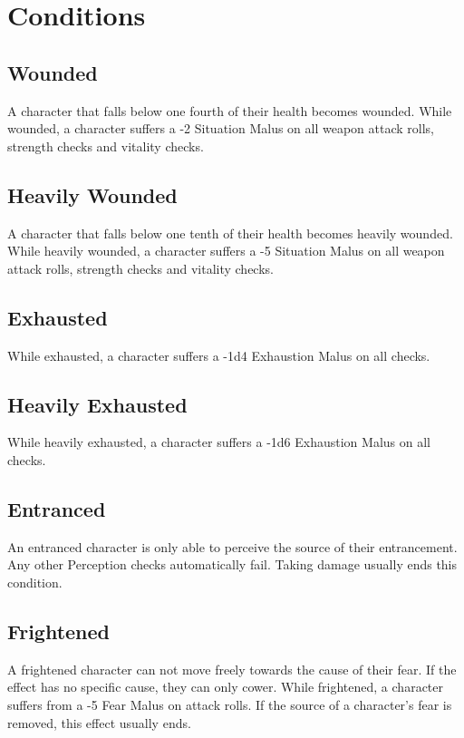 \chapter{Conditions}\label{ch:conditions}
\section{Wounded}\label{condition:wounded}
A character that falls below one fourth of their health becomes wounded.
While wounded, a character suffers a -2 Situation Malus on all weapon attack rolls, strength checks and vitality checks.

\section{Heavily Wounded}\label{condition:heavilyWounded}
A character that falls below one tenth of their health becomes heavily wounded.
While heavily wounded, a character suffers a -5 Situation Malus on all weapon attack rolls, strength checks and vitality checks.

\section{Exhausted}\label{condition:exhausted}
While exhausted, a character suffers a -1d4 Exhaustion Malus on all checks.

\section{Heavily Exhausted}\label{condition:heavilyExhausted}
While heavily exhausted, a character suffers a -1d6 Exhaustion Malus on all checks.

\section{Entranced}\label{condition:entranced}
An entranced character is only able to perceive the source of their entrancement.
Any other Perception checks automatically fail.
Taking damage usually ends this condition.

\section{Frightened}\label{condition:frightened}
A frightened character can not move freely towards the cause of their fear.
If the effect has no specific cause, they can only cower.
While frightened, a character suffers from a -5 Fear Malus on attack rolls.
If the source of a character's fear is removed, this effect usually ends.


